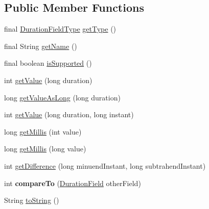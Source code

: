 \subsection*{Public Member Functions}
\begin{DoxyCompactItemize}
\item 
final \hyperlink{classorg_1_1joda_1_1time_1_1_duration_field_type}{Duration\-Field\-Type} \hyperlink{classorg_1_1joda_1_1time_1_1field_1_1_base_duration_field_aece0dff3933b177f668d22ddb4aaf87e}{get\-Type} ()
\item 
final String \hyperlink{classorg_1_1joda_1_1time_1_1field_1_1_base_duration_field_ab16aa653d798338f311093e677dfbc29}{get\-Name} ()
\item 
final boolean \hyperlink{classorg_1_1joda_1_1time_1_1field_1_1_base_duration_field_aef1fc336b3a568e023c283a4ed69adfb}{is\-Supported} ()
\item 
int \hyperlink{classorg_1_1joda_1_1time_1_1field_1_1_base_duration_field_a831fcbe71602a5e137280a3aab59ddd7}{get\-Value} (long duration)
\item 
long \hyperlink{classorg_1_1joda_1_1time_1_1field_1_1_base_duration_field_ae2db64a1062b56bb2dbe1d8c67e406b1}{get\-Value\-As\-Long} (long duration)
\item 
int \hyperlink{classorg_1_1joda_1_1time_1_1field_1_1_base_duration_field_ae7ede3f39304f938ac051539d1188af0}{get\-Value} (long duration, long instant)
\item 
long \hyperlink{classorg_1_1joda_1_1time_1_1field_1_1_base_duration_field_a9d6602a0ea007da0c1ac298d17fd655e}{get\-Millis} (int value)
\item 
long \hyperlink{classorg_1_1joda_1_1time_1_1field_1_1_base_duration_field_a77b1a94256cd914936ff36b8c8fe81b7}{get\-Millis} (long value)
\item 
int \hyperlink{classorg_1_1joda_1_1time_1_1field_1_1_base_duration_field_adf240a882b1b5b3eafd23ec9e129f2c2}{get\-Difference} (long minuend\-Instant, long subtrahend\-Instant)
\item 
\hypertarget{classorg_1_1joda_1_1time_1_1field_1_1_base_duration_field_ae93a7f1a62055751471c99afa3db9d88}{int {\bfseries compare\-To} (\hyperlink{classorg_1_1joda_1_1time_1_1_duration_field}{Duration\-Field} other\-Field)}\label{classorg_1_1joda_1_1time_1_1field_1_1_base_duration_field_ae93a7f1a62055751471c99afa3db9d88}

\item 
String \hyperlink{classorg_1_1joda_1_1time_1_1field_1_1_base_duration_field_a20f627e51fed6419e43032fa8bc8cb8c}{to\-String} ()
\end{DoxyCompactItemize}
